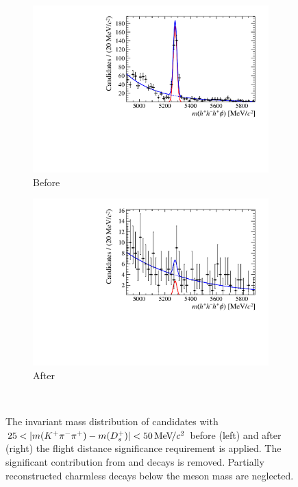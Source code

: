 \begin{figure}[!h]
    \centering
    \begin{subfigure}[t]{0.4\textwidth}
        \includegraphics[width=1.0\textwidth]{figs/Selection/Signal_Ds2KPiPi_Test2_0_000000_DslessFDCHI2.pdf}
        \caption{Before}
    \end{subfigure}%
    \begin{subfigure}[t]{0.4\textwidth}
        \includegraphics[width=1.0\textwidth]{figs/Selection/Signal_Ds2KPiPi_Test2_25_000000_DslessFDCHI2.pdf}
        \caption{After}
    \end{subfigure}\\
    \caption{The invariant mass distribution of \decay{\Bp}{(\decay{\Dsp}{\Kp\pim\pip})\phiz} candidates with $25 < |m({{K}^+}{{\pi}^-}{{\pi}^+}) - m({{D}^+_{s}})| < 50{\mathrm{\,Me\kern -0.1em V\!/}c^2} $ before (left) and after (right) the flight distance significance requirement is applied. The significant contribution from \decay{\Bp}{\Kp\pim\pip\phiz} and \decay{\Bp}{\Kp\pim\pip\Kp\Km} decays is removed. Partially reconstructed charmless decays below the \Bp meson mass are neglected.}
    \label{fig:Selection_charmless_before_after}   
\end{figure}




